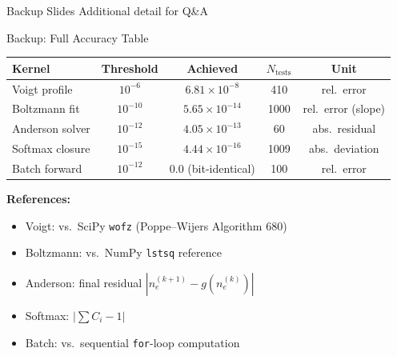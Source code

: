 \documentclass[aspectratio=169,10pt]{beamer}
\begin{document}
\appendix

\begin{frame}{Backup Slides}
	\centering
	{\Large Additional detail for Q\&A}
\end{frame}

\begin{frame}{Backup: Full Accuracy Table}
	\centering
	\begin{tabular}{lcccc}
		\toprule
		\textbf{Kernel} & \textbf{Threshold} & \textbf{Achieved} & \textbf{$N_\text{tests}$} & \textbf{Unit} \\
		\midrule
		Voigt profile   & $10^{-6}$  & $6.81 \times 10^{-8}$  & 410  & rel.\ error \\
		Boltzmann fit   & $10^{-10}$ & $5.65 \times 10^{-14}$ & 1000 & rel.\ error (slope) \\
		Anderson solver & $10^{-12}$ & $4.05 \times 10^{-13}$ & 60   & abs.\ residual \\
		Softmax closure & $10^{-15}$ & $4.44 \times 10^{-16}$ & 1009 & abs.\ deviation \\
		Batch forward   & $10^{-12}$ & $0.0$ (bit-identical)   & 100  & rel.\ error \\
		\bottomrule
	\end{tabular}

	\vspace{1em}
	\textbf{References:}
	\begin{itemize}
		\item Voigt: vs.\ SciPy \texttt{wofz} (Poppe--Wijers Algorithm 680)
		\item Boltzmann: vs.\ NumPy \texttt{lstsq} reference
		\item Anderson: final residual $|n_e^{(k+1)} - g(n_e^{(k)})|$
		\item Softmax: $|\sum C_i - 1|$
		\item Batch: vs.\ sequential \texttt{for}-loop computation
	\end{itemize}
\end{frame}
\end{document}
